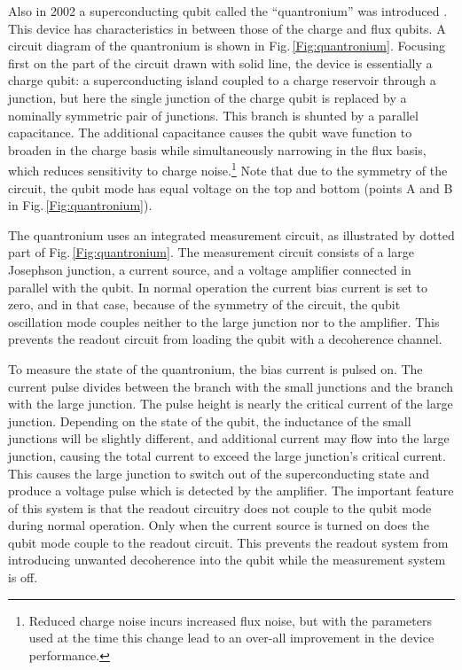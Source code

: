 Also in 2002 a superconducting qubit called the ``quantronium'' was introduced \cite{Vion:quantronium2002}.
This device has characteristics in between those of the charge and flux qubits.
A circuit diagram of the quantronium is shown in Fig.\,\ref{Fig:quantronium}.
Focusing first on the part of the circuit drawn with solid line, the device is essentially a charge qubit: a superconducting island coupled to a charge reservoir through a junction, but here the single junction of the charge qubit is replaced by a nominally symmetric pair of junctions.
This branch is shunted by a parallel capacitance.
The additional capacitance causes the qubit wave function to broaden in the charge basis while simultaneously narrowing in the flux basis, which reduces sensitivity to charge noise.\footnote{Reduced charge noise incurs increased flux noise, but with the parameters used at the time this change lead to an over-all improvement in the device performance.}
Note that due to the symmetry of the circuit, the qubit mode has equal voltage on the top and bottom (points A and B in Fig.\,\ref{Fig:quantronium}).

The quantronium uses an integrated measurement circuit, as illustrated by dotted part of Fig.\,\ref{Fig:quantronium}.
The measurement circuit consists of a large Josephson junction, a current source, and a voltage amplifier connected in parallel with the qubit.
In normal operation the current bias current is set to zero, and in that case, because of the symmetry of the circuit, the qubit oscillation mode couples neither to the large junction nor to the amplifier.
This prevents the readout circuit from loading the qubit with a decoherence channel.

To measure the state of the quantronium, the bias current is pulsed on.
The current pulse divides between the branch with the small junctions and the branch with the large junction.
The pulse height is nearly the critical current of the large junction.
Depending on the state of the qubit, the inductance of the small junctions will be slightly different, and additional current may flow into the large junction, causing the total current to exceed the large junction's critical current.
This causes the large junction to switch out of the superconducting state and produce a voltage pulse which is detected by the amplifier.
The important feature of this system is that the readout circuitry does not couple to the qubit mode during normal operation.
Only when the current source is turned on does the qubit mode couple to the readout circuit.
This prevents the readout system from introducing unwanted decoherence into the qubit while the measurement system is off.

